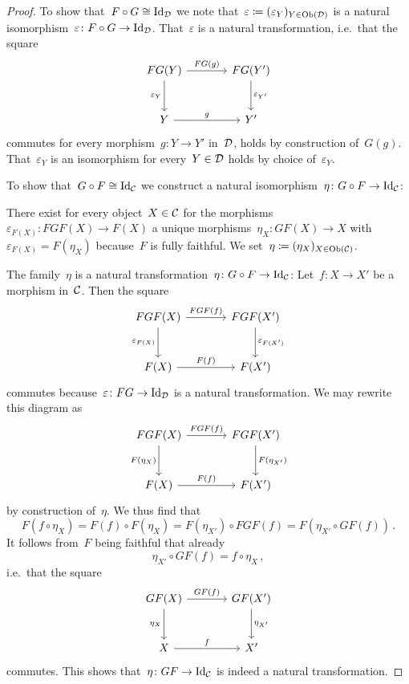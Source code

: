 \begin{proof}
  To show that~$F \circ G \cong \mathrm{Id}_{\mathcal{D}}$ we note that~$\varepsilon \coloneqq (\varepsilon_Y)_{Y \in \operatorname{Ob}(\mathcal{D})}$ is a natural isomorphism~$\varepsilon \colon F \circ G \to \mathrm{Id}_{\mathcal{D}}$.
  That~$\varepsilon$ is a natural transformation, i.e.\ that the square
  \[
    \begin{tikzcd}[sep = large]
        FG(Y)
        \arrow{r}[above]{FG(g)}
        \arrow{d}[left]{\varepsilon_Y}
      & FG(Y')
        \arrow{d}[right]{\varepsilon_{Y'}}
      \\
        Y
        \arrow{r}[above]{g}
      & Y'
    \end{tikzcd}
  \]
  commutes for every morphism~$g \colon Y \to Y'$ in~$\mathcal{D}$, holds by construction of~$G(g)$.
  That~$\varepsilon_Y$ is an isomorphism for every~$Y \in \mathcal{D}$ holds by choice of~$\varepsilon_Y$.
  
  To show that~$G \circ F \cong \mathrm{Id}_{\mathcal{C}}$ we construct a natural isomorphism~$\eta \colon G \circ F \to \mathrm{Id}_{\mathcal{C}}$:
  
  There exist for every object~$X \in \mathcal{C}$ for the morphisms~$\varepsilon_{F(X)} \colon FGF(X) \to F(X)$ a unique morphisms~$\eta_X \colon GF(X) \to X$ with~$\varepsilon_{F(X)} = F(\eta_X)$ because~$F$ is fully faithful.
  We set~$\eta \coloneqq (\eta_X)_{X \in \operatorname{Ob}(\mathcal{C})}$.
  
  The family~$\eta$ is a natural transformation~$\eta \colon G \circ F \to \mathrm{Id}_{\mathcal{C}}$:
  Let~$f \colon X \to X'$ be a morphism in~$\mathcal{C}$.
  Then the square
  \[
    \begin{tikzcd}[sep = large]
        FGF(X)
        \arrow{r}[above]{FGF(f)}
        \arrow{d}[left]{\varepsilon_{F(X)}}
      & FGF(X')
        \arrow{d}[right]{\varepsilon_{F(X')}}
      \\
        F(X)
        \arrow{r}[above]{F(f)}
      & F(X')
    \end{tikzcd}
  \]
  commutes because~$\varepsilon \colon FG \to \mathrm{Id}_{\mathcal{D}}$ is a natural transformation.
  We may rewrite this diagram as
  \[
    \begin{tikzcd}[sep = large]
        FGF(X)
        \arrow{r}[above]{FGF(f)}
        \arrow{d}[left]{F(\eta_X)}
      & FGF(X')
        \arrow{d}[right]{F(\eta_{X'})}
      \\
        F(X)
        \arrow{r}[above]{F(f)}
      & F(X')
    \end{tikzcd}
  \]
  by construction of~$\eta$.
  We thus find that
  \[
      F(f \circ \eta_X)
    = F(f) \circ F(\eta_X)
    = F(\eta_{X'}) \circ FGF(f)
    = F(\eta_{X'} \circ GF(f)) \,.
  \]
  It follows from~$F$ being faithful that already
  \[
      \eta_{X'} \circ GF(f)
    = f \circ \eta_X \,,
  \]
  i.e.\ that the square
  \begin{equation}
    \label{naturality of eta}
    \begin{tikzcd}[sep = large]
        GF(X)
        \arrow{r}[above]{GF(f)}
        \arrow{d}[left]{\eta_X}
      & GF(X')
        \arrow{d}[right]{\eta_{X'}}
      \\
        X
        \arrow{r}[above]{f}
      & X'
    \end{tikzcd}
  \end{equation}
  commutes.
  This shows that~$\eta \colon GF \to \mathrm{Id}_{\mathcal{C}}$ is indeed a natural transformation.
  

\end{proof}
